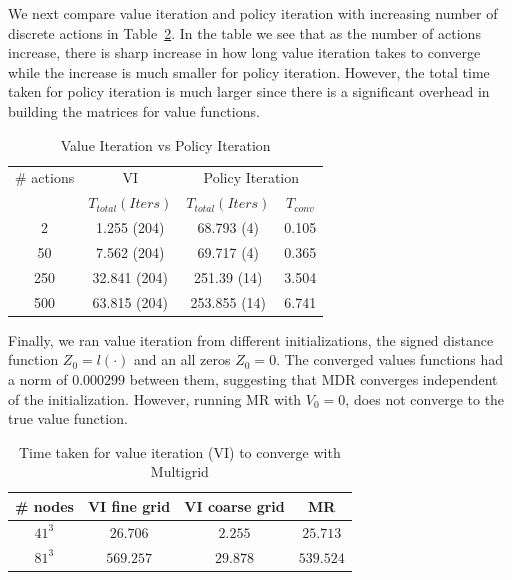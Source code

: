 We next compare value iteration and policy iteration with increasing number of discrete actions in Table~\ref{tab:v_vs_p}. In the table we see that as the number of actions increase, there is sharp increase in how long value iteration takes to converge   while the increase is much smaller for policy iteration. However, the total time taken for policy iteration is much larger since there is a significant overhead in building the matrices for value functions. 
\begin{table}
\centering
\caption{Value Iteration vs Policy Iteration}
\label{tab:v_vs_p}
\begin{tabular}{|c| c| c| c|}
\hline
\# actions & VI & \multicolumn{2}{|c|}{Policy Iteration} \\ \cline{3-4}
 &  $T_{total} (Iters)$ & $T_{total}(Iters)$ & $T_{conv}$ \\ \hline
2 & 1.255 (204) & 68.793 (4) & 0.105 \\ \hline
50 &  7.562 (204)&  69.717 (4)& 0.365 \\ \hline
250 & 32.841 (204)&  251.39 (14)& 3.504 \\ \hline
500 & 63.815 (204)&  253.855 (14)& 6.741 \\
\hline
\end{tabular}
\end{table}

Finally, we ran value iteration from different initializations, the signed distance function $Z_0 = l(\cdot)$ and an all zeros $Z_0= 0$. The converged values functions had a norm of $0.000299$ between them, suggesting that MDR converges independent of the initialization. However, running MR with $V_0 = 0$, does not converge to the true value function.

\begin{table}
\centering
\caption{Time taken for value iteration (VI) to converge with Multigrid}
\label{tab:v_vs_p}
\begin{tabular}{|c| c| c| c| }
\hline
\# nodes & VI fine grid & VI coarse grid & MR \\ \hline
$41^3$ & $26.706$ & $2.255$ & $25.713$ \\ \hline
$81^3$ & $569.257$ & $29.878$ & $539.524$ \\ \hline
\end{tabular}
\end{table}